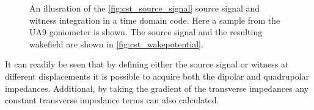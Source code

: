 \begin{figure}
\caption{An illusration of the \ref{fig:cst_source_signal} source signal and witness integration in a time domain code. Here a sample from the UA9 goniometer is shown. The source signal and the resulting wakefield are shown in \ref{fig:cst_wakepotential}.}
\label{fig:time_domain_beam}
\end{figure}

It can readily be seen that by defining either the source signal or witness at different displacements it is possible to acquire both the dipolar and quadrupolar impedances. Additional, by taking the gradient of the transverse impedances any constant transverse impedance terms can also calculated.

